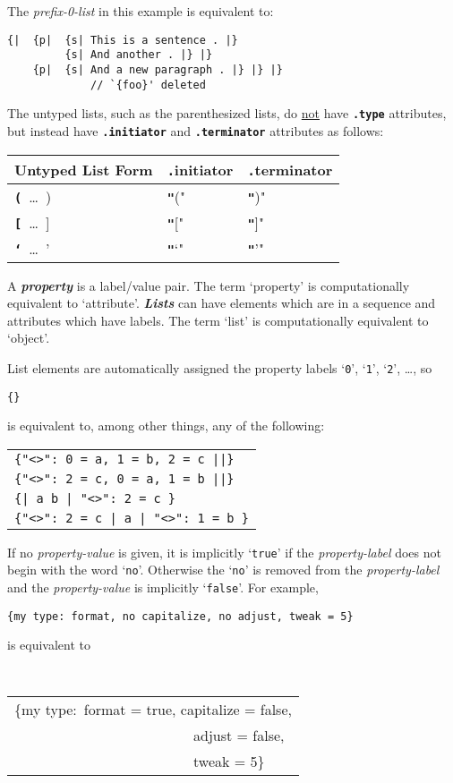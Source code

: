 \documentclass[12pt]{article}
\newcommand{\TT}[1]{{\tt \bfseries #1}}
\newcommand{\key}[1]{{\bf \em #1}\index{#1}}
\newcommand{\ikey}[2]{{\bf \em #1}\index{#2}}
\newenvironment{indpar}[1][0.3in]%
	{\begin{list}{}%
		     {\setlength{\itemsep}{0in}%
		      \setlength{\topsep}{0in}%
		      \setlength{\parsep}{1ex}%
		      \setlength{\labelwidth}{#1}%
		      \setlength{\leftmargin}{#1}%
		      \addtolength{\leftmargin}{\labelsep}}%
	 \item}%
	{\end{list}}
\begin{document}
The {\em prefix-0-list} in this example is equivalent to:
\begin{indpar}\begin{verbatim}
{|  {p|  {s| This is a sentence . |}
         {s| And another . |} |}
    {p|  {s| And a new paragraph . |} |} |}
             // `{foo}' deleted
\end{verbatim}\end{indpar}

The untyped lists, such as the parenthesized lists, do \underline{not}
have \TT{.type} attributes, but instead have \TT{.initiator} and
\TT{.terminator} attributes as follows:
\begin{center}
\begin{tabular}{lll}
Untyped List Form	& \TT .initiator & \TT .terminator
\\\hline
\TT (~\ldots~)		& \TT "("	 & \TT ")" \\
\TT [~\ldots~]		& \TT "["	 & \TT "]" \\
\TT `~\ldots~'		& \TT "`"	 & \TT "'" \\
\end{tabular}
\end{center}

A \key{property} is a label/value pair.  The term `property' is
computationally equivalent to `attribute'.
\ikey{Lists}{list}
can have elements which are in a sequence and attributes which
have labels.  The term `list' is computationally equivalent to `object'.

List elements are automatically assigned
the property labels `{\tt 0}', `{\tt 1}', `{\tt 2}', \ldots{}, so
\begin{center}
\tt \{< a b c >\}
\end{center}
is equivalent to, among other things, any of the following:
\begin{center}
\begin{tabular}{l}
\tt \{"<>":~0 = a, 1 = b, 2 = c ||\} \\
\tt \{"<>":~2 = c, 0 = a, 1 = b ||\} \\
\tt \{| a b | "<>": 2 = c \} \\
\tt \{"<>": 2 = c | a | "<>": 1 = b \}
\end{tabular}
\end{center}

If no {\em property-value} is given, it is implicitly `{\tt true}'
if the {\em property-label} does not begin with the word `{\tt no}'.
Otherwise the `{\tt no}' is removed
from the {\em property-label} and the {\em property-value}
is implicitly `{\tt false}'.  For example,
\begin{center}
\tt \{my type:~format, no capitalize, no adjust, tweak = 5\}
\end{center}
is equivalent to
\begin{center}
\tt
\begin{tabular}{@{}l@{}}
\{my type:~format = true, capitalize = false, \\
~~~~~~~~~~~~~~~~~~~~~~~~~adjust = false, \\
~~~~~~~~~~~~~~~~~~~~~~~~~tweak = 5\} \\
\end{tabular}
\end{center}
\end{document}

